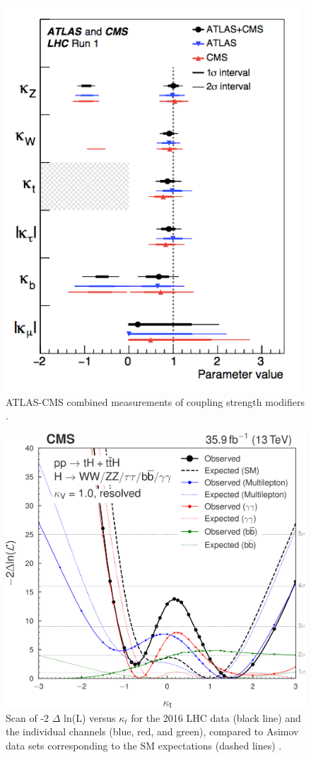 \documentclass[final,3p]{CSP}
\begin{document}
  \begin{figure}[H]
    \centering
    \includegraphics[scale=0.4]{./couplings.png}
    \caption{ATLAS-CMS combined measurements of coupling strength modifiers \cite{Tanabashi:2018oca}.}
    \label{figureKappas}
  \end{figure}
  
  \begin{figure}[H]
    \centering
    \includegraphics[width=0.4 \columnwidth]{./cms13.png}
    \caption{Scan of -2 $\Delta$ ln(L) versus $\kappa_t$ for the 2016 LHC data (black line) and the individual channels (blue, red, and green), compared to Asimov data sets corresponding to the SM expectations (dashed lines) \cite{sirunyan2019search}.}
    \label{figureKt}
  \end{figure}
  
\end{document}
